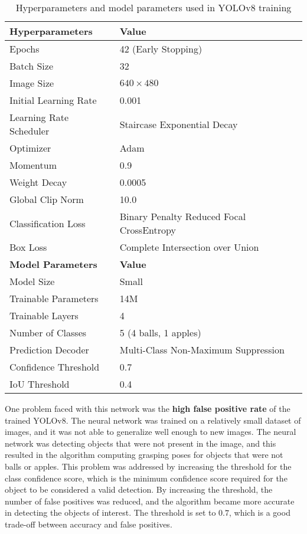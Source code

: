 \begin{table}[t]
    \centering
    \begin{tabular}{|l|l|}
    \hline
    \textbf{Hyperparameters} & \textbf{Value} \\
    \hline
    Epochs & 42 (Early Stopping) \\
    Batch Size & 32 \\
    Image Size & $640 \times 480$ \\
    Initial Learning Rate & 0.001 \\
    Learning Rate Scheduler & Staircase Exponential Decay \\
    Optimizer & Adam \\
    Momentum & 0.9 \\
    Weight Decay & 0.0005 \\
    Global Clip Norm & 10.0 \\
    Classification Loss & Binary Penalty Reduced Focal CrossEntropy \\
    Box Loss & Complete Intersection over Union \\
    \hline
    \textbf{Model Parameters} & \textbf{Value} \\
    \hline
    Model Size & Small \\
    Trainable Parameters & 14M \\
    Trainable Layers & 4 \\
    Number of Classes & 5 (4 balls, 1 apples) \\
    Prediction Decoder & Multi-Class Non-Maximum Suppression \\
    Confidence Threshold & 0.7 \\
    IoU Threshold & 0.4 \\
    \hline
    \end{tabular}
    \caption{Hyperparameters and model parameters used in YOLOv8 training}
    \label{table:hyperparameters}
\end{table}

One problem faced with this network was the \textbf{high false positive rate} of the trained YOLOv8.
The neural network was trained on a relatively small dataset of images, and it was not able
to generalize well enough to new images. The neural network was detecting objects that were not present in the image,
and this resulted in the algorithm computing grasping poses for objects that were not balls or apples.
This problem was addressed by increasing the threshold for the class confidence score, which is the minimum
confidence score required for the object to be considered a valid detection. By increasing the threshold,
the number of false positives was reduced, and the algorithm became more accurate in detecting the objects
of interest. The threshold is set to $0.7$, which is a good trade-off between accuracy and false positives.

